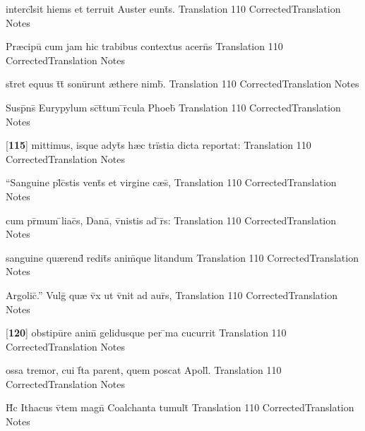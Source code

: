 \latline
  {intercl\={}sit hiems et terruit Auster eunt\={\macron {\i}}s.}
  { Translation }
  {110}
  { CorrectedTranslation }
  { Notes }


\latline
  {Pr{\ae}cipu\={} cum jam hic trabibus contextus acern\={\macron {\i}}s}
  { Translation }
  {110}
  { CorrectedTranslation }
  { Notes }


\latline
  {st\={}ret equus t\={}t\={} sonu\={}runt {\ae}there nimb\={\macron {\i}}.}
  { Translation }
  {110}
  { CorrectedTranslation }
  { Notes }


\latline
  {Susp\={}ns\={\macron {\i}} Eurypylum sc\={\macron {\i}}t\={}tum \={}r\={}cula Phoeb\={\macron {\i}}}
  { Translation }
  {110}
  { CorrectedTranslation }
  { Notes }


\latline
  {[\textbf{115}] mittimus, isque adyt\={\macron {\i}}s h{\ae}c tr\"{i}stia dicta reportat:}
  { Translation }
  {110}
  { CorrectedTranslation }
  { Notes }


\latline
  {``Sanguine pl\={}c\={}stis vent\={}s et virgine c{\ae}s\={},}
  { Translation }
  {110}
  { CorrectedTranslation }
  { Notes }


\latline
  {cum pr\={\macron {\i}}mum \={}liac\={}s, Dana\={\macron {\i}}, v\={}nistis ad \={}r\={}s:}
  { Translation }
  {110}
  { CorrectedTranslation }
  { Notes }


\latline
  {sanguine qu{\ae}rend\={\macron {\i}} redit\={}s anim\={}que litandum}
  { Translation }
  {110}
  { CorrectedTranslation }
  { Notes }


\latline
  {Argolic\={}.''  Vulg\={\macron {\i}} qu{\ae} v\={}x ut v\={}nit ad aur\={\macron {\i}}s,}
  { Translation }
  {110}
  { CorrectedTranslation }
  { Notes }


\latline
  {[\textbf{120}] obstipu\={}re anim\={\macron {\i}} gelidusque per \={\macron {\i}}ma cucurrit}
  { Translation }
  {110}
  { CorrectedTranslation }
  { Notes }


\latline
  {ossa tremor, cui f\={}ta parent, quem poscat Apoll\={}.}
  { Translation }
  {110}
  { CorrectedTranslation }
  { Notes }


\latline
  {H\={\macron {\i}}c Ithacus v\={}tem magn\={} Coalchanta tumult\={}}
  { Translation }
  {110}
  { CorrectedTranslation }
  { Notes }


